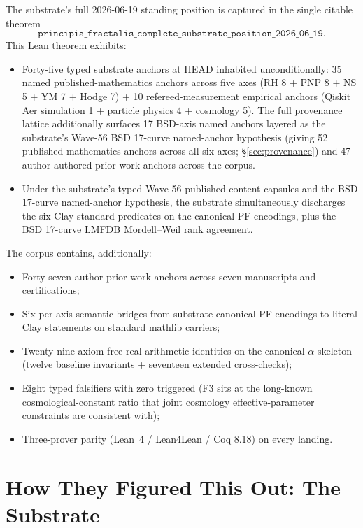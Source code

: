 \documentclass[11pt,a4paper]{amsart}
\theoremstyle{plain}
\theoremstyle{definition}
\begin{document}
The substrate's full 2026-06-19 standing position is captured in the single citable theorem
\[
\texttt{principia\_fractalis\_complete\_substrate\_position\_2026\_06\_19}.
\]
This Lean theorem exhibits:
\begin{itemize}[itemsep=2pt]
\item Forty-five typed substrate anchors at HEAD inhabited unconditionally:
35 named published-mathematics anchors across five axes (RH 8 + PNP 8 + NS 5 + YM 7 + Hodge 7) + 10 refereed-measurement empirical anchors (Qiskit Aer simulation 1 + particle physics 4 + cosmology 5). The full provenance lattice additionally surfaces 17 BSD-axis named anchors layered as the substrate's Wave-56 BSD 17-curve named-anchor hypothesis (giving 52 published-mathematics anchors across all six axes; \S\ref{sec:provenance}) and 47 author-authored prior-work anchors across the corpus.
\item Under the substrate's typed Wave 56 published-content capsules and the BSD 17-curve named-anchor hypothesis, the substrate simultaneously discharges the six Clay-standard predicates on the canonical PF encodings, plus the BSD 17-curve LMFDB Mordell--Weil rank agreement.
\end{itemize}

The corpus contains, additionally:
\begin{itemize}[itemsep=2pt]
\item Forty-seven author-prior-work anchors across seven manuscripts and certifications;
\item Six per-axis semantic bridges from substrate canonical PF encodings to literal Clay statements on standard mathlib carriers;
\item Twenty-nine axiom-free real-arithmetic identities on the canonical $\alpha$-skeleton (twelve baseline invariants + seventeen extended cross-checks);
\item Eight typed falsifiers with zero triggered (F3 sits at the long-known cosmological-constant ratio that joint cosmology effective-parameter constraints are consistent with);
\item Three-prover parity (Lean~4 / Lean4Lean / Coq 8.18) on every landing.
\end{itemize}

\section{How They Figured This Out: The Substrate}\label{sec:how}
\end{document}

